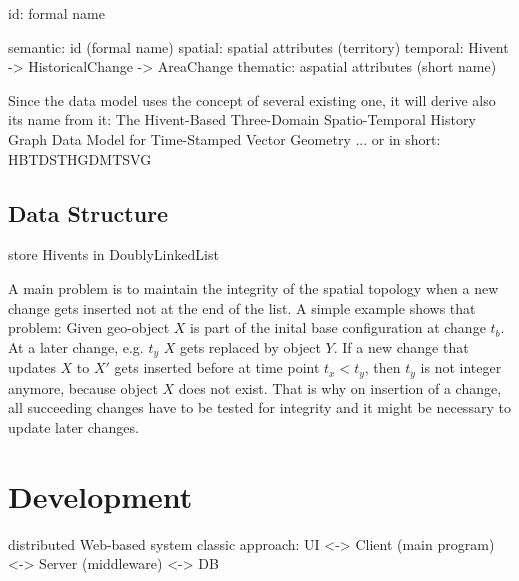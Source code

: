 id: formal name

semantic: id (formal name)
spatial:  spatial attributes (territory)
temporal: Hivent -> HistoricalChange -> AreaChange
thematic: aspatial attributes (short name)

Since the data model uses the concept of several existing one, it will derive also its name from it: The Hivent-Based Three-Domain Spatio-Temporal History Graph Data Model for Time-Stamped Vector Geometry
... or in short: HBTDSTHGDMTSVG


\subsection{Data Structure} %
\label{sub:data_structure}

store Hivents in DoublyLinkedList



A main problem is to maintain the integrity of the spatial topology when a new change gets inserted not at the end of the list. A simple example shows that problem: Given geo-object $X$ is part of the inital base configuration at change $t_b$. At a later change, e.g. $t_y$ $X$ gets replaced by object $Y$. If a new change that updates $X$ to $X'$ gets inserted before at time point $t_x < t_y$, then $t_y$ is not integer anymore, because object $X$ does not exist. That is why on insertion of a change, all succeeding changes have to be tested for integrity and it might be necessary to update later changes.



\label{sec:development}

\section{Development} %

distributed Web-based system
classic approach: UI <-> Client (main program) <-> Server (middleware) <-> DB

